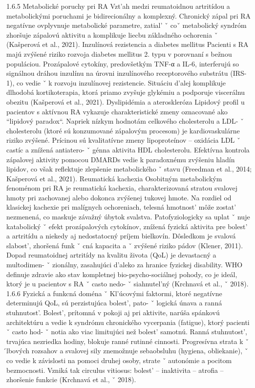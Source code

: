 { 1.6.5 Metabolické poruchy pri RA Vzt’ah medzi reumatoidnou artritídou a metabolickými poruchami je bidirecionálny a komplexný. Chronický zápal pri RA negatívne ovplyvnuje metabolické parametre, zatial’ ˇ coˇ metabolický syndróm zhoršuje zápalovú aktivitu a komplikuje liecbu základného ochorenia ˇ (Kašperová et al., 2021).
 Inzulínová rezistencia a diabetes mellitus Pacienti s RA majú zvýšené riziko rozvoja diabetes mellitus 2. typu v porovnaní s bežnou populáciou. Prozápalové cytokíny, predovšetkým TNF-α a IL-6, interferujú so signálnou dráhou inzulínu na úrovni inzulínového receptorového substrátu (IRS-1), co vedie ˇ k rozvoju inzulínovej rezistencie. Situáciu d’alej komplikuje dlhodobá kortikoterapia, ktorá priamo zvyšuje glykémiu a podporuje viscerálnu obezitu (Kašperová et al., 2021).
 Dyslipidémia a ateroskleróza Lipidový profil u pacientov s aktívnou RA vykazuje charakteristické zmeny oznacované ako ``lipidový paradox``. Napriek nízkym hodnotám celkového cholesterolu a LDL- ˇ cholesterolu (ktoré sú konzumované zápalovým procesom) je kardiovaskulárne riziko zvýšené. Prícinou sú kvalitatívne zmeny lipoproteínov – oxidácia LDL ˇ castíc a znížená antiatero- ˇ génna aktivita HDL cholesterolu. Efektívna kontrola zápalovej aktivity pomocou DMARDs vedie k paradoxnému zvýšeniu hladín lipidov, co však reflektuje zlepšenie metabolického ˇ stavu (Freedman et al., 2014; Kašperová et al., 2021).
 Reumatická kachexia Osobitným metabolickým fenoménom pri RA je reumatická kachexia, charakterizovaná stratou svalovej hmoty pri zachovanej alebo dokonca zvýšenej tukovej hmote. Na rozdiel od klasickej kachexie pri malígnych ochoreniach, telesná hmotnost’ môže zostat’ nezmenená, co maskuje závažný úbytok svalstva. Patofyziologicky sa uplat ˇ nuje katabolický ˇ efekt prozápalových cytokínov, znížená fyzická aktivita pre bolest’ a artritídu a niekedy aj nedostatocný príjem bielkovín. Dôsledkom je svalová slabost’, zhoršená funk ˇ cná kapacita a ˇ zvýšené riziko pádov (Klener, 2011).
 Dopad reumatoidnej artritídy na kvalitu života (QoL) je devastacný a multodimen- ˇ zionálny, zasahujúci d’aleko za hranice fyzickej disability. WHO definuje zdravie ako stav kompletnej bio-psycho-sociálnej pohody, co je ideál, ktorý je u pacientov s RA ˇ casto nedo- ˇ siahnutel’ný (Krchnavá et al., ˇ 2018).
 1.6.6 Fyzická a funkcná doména ˇ Kl’úcovými faktormi, ktoré negatívne determinujú QoL, sú perzistujúca bolest’, pato- ˇ logická únava a ranná stuhnutost’. Bolest’, prítomná v pokoji aj pri aktivite, narúša spánkovú architektúru a vedie k syndrómu chronického vycerpania (fatigue), ktorý pacienti ˇ casto hod- ˇ notia ako viac limitujúci než bolest’ samotnú. Ranná stuhnutost’, trvajúca nezriedka hodiny, blokuje ranné rutinné cinnosti. Progresívna strata k ˇ  ́lbových rozsahov a svalovej sily znemožnuje sebaobsluhu (hygiena, obliekanie), ˇ co vedie k závislosti na pomoci druhej osoby, strate ˇ autonómie a pocitom bezmocnosti. Vzniká tak circulus vitiosus: bolest’ – inaktivita – atrofia – zhoršenie funkcie (Krchnavá et al., ˇ 2018).
}
